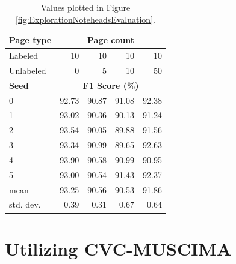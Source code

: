 \begin{table}[ht]
    \centering
    \begin{tabular}{l@{\hspace{2.0cm}}rrrr}
        \toprule
        \textbf{Page type} & \multicolumn{4}{c}{\textbf{Page count}} \\
        \midrule
        Labeled   & 10 & 10 & 10 & 10 \\
        Unlabeled & 0  & 5  & 10 & 50 \\
        \midrule
        \textbf{Seed} & \multicolumn{4}{c}{\textbf{F1 Score (\%)}} \\
        \midrule
        0 & 92.73 & 90.87 & 91.08 & 92.38 \\
        1 & 93.02 & 90.36 & 90.13 & 91.24 \\
        2 & 93.54 & 90.05 & 89.88 & 91.56 \\
        3 & 93.34 & 90.99 & 89.65 & 92.63 \\
        4 & 93.90 & 90.58 & 90.99 & 90.95 \\
        5 & 93.00 & 90.54 & 91.43 & 92.37 \\
        \midrule
        mean & 93.25 & 90.56 & 90.53 & 91.86 \\
        std. dev. & 0.39 & 0.31 & 0.67 & 0.64 \\
        \bottomrule
    \end{tabular}
    \caption{Values plotted in Figure \ref{fig:ExplorationNoteheadsEvaluation}.}
    \label{tab:ExplorationNoteheads}
\end{table}


\section{Utilizing CVC-MUSCIMA}
\label{sec:UtilizingCvcMuscima}

